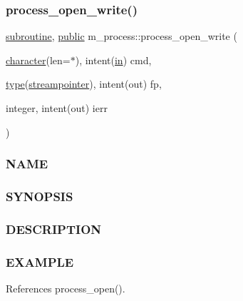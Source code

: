 \subsubsection{\texorpdfstring{process\+\_\+open\+\_\+write()}{process\_open\_write()}}
{\footnotesize\ttfamily \hyperlink{M__stopwatch_83_8txt_acfbcff50169d691ff02d4a123ed70482}{subroutine}, \hyperlink{M__stopwatch_83_8txt_a2f74811300c361e53b430611a7d1769f}{public} m\+\_\+process\+::process\+\_\+open\+\_\+write (\begin{DoxyParamCaption}\item[{\hyperlink{option__stopwatch_83_8txt_abd4b21fbbd175834027b5224bfe97e66}{character}(len=$\ast$), intent(\hyperlink{M__journal_83_8txt_afce72651d1eed785a2132bee863b2f38}{in})}]{cmd,  }\item[{\hyperlink{stop__watch_83_8txt_a70f0ead91c32e25323c03265aa302c1c}{type}(\hyperlink{structm__process_1_1streampointer}{streampointer}), intent(out)}]{fp,  }\item[{integer, intent(out)}]{ierr }\end{DoxyParamCaption})}



\subsubsection*{N\+A\+ME}

\subsubsection*{S\+Y\+N\+O\+P\+S\+IS}

\subsubsection*{D\+E\+S\+C\+R\+I\+P\+T\+I\+ON}

\subsubsection*{E\+X\+A\+M\+P\+LE}

References process\+\_\+open().

\mbox{\label{namespacem__process_a7dd759a1344789477ae1e205d7fa9a51}} 
